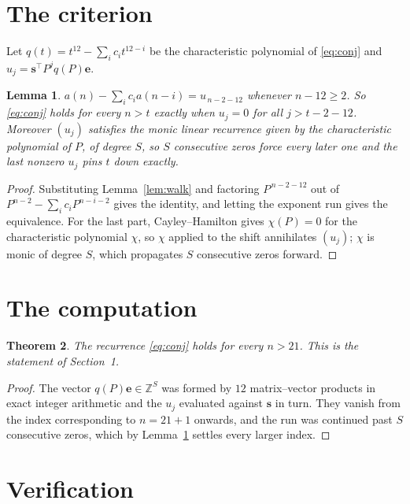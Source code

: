 \documentclass[11pt,a4paper]{article}
\theoremstyle{plain}
\newtheorem{theorem}{Theorem}
\newtheorem{lemma}[theorem]{Lemma}
\theoremstyle{definition}
\begin{document}
\section{The criterion}

Let $q(t)=t^{12}-\sum_i c_i t^{12-i}$ be the characteristic polynomial of
\eqref{eq:conj} and $u_j=\mathbf{s}^{\!\top}P^{j}q(P)\mathbf{e}$.

\begin{lemma}\label{lem:crit}
$a(n)-\sum_i c_i a(n-i)=u_{\,n-2-12}$ whenever $n-12\ge2$. So \eqref{eq:conj}
holds for every $n>t$ exactly when $u_j=0$ for all $j>t-2-12$. Moreover $(u_j)$
satisfies the monic linear recurrence given by the characteristic polynomial of $P$, of
degree $S$, so $S$ consecutive zeros force every later one and the last nonzero $u_j$ pins
$t$ down exactly.
\end{lemma}

\begin{proof}
Substituting Lemma~\ref{lem:walk} and factoring $P^{\,n-2-12}$ out of
$P^{n-2}-\sum_i c_i P^{n-i-2}$ gives the identity, and letting the exponent run gives the
equivalence. For the last part, Cayley--Hamilton gives $\chi(P)=0$ for the characteristic
polynomial $\chi$, so $\chi$ applied to the shift annihilates $(u_j)$; $\chi$ is monic of
degree $S$, which propagates $S$ consecutive zeros forward.
\end{proof}

\section{The computation}

\begin{theorem}
The recurrence \eqref{eq:conj} holds for every $n>21$. This is the statement of
Section~1.
\end{theorem}

\begin{proof}
The vector $q(P)\mathbf{e}\in\mathbb{Z}^{S}$ was formed by $12$ matrix--vector
products in exact integer arithmetic and the $u_j$ evaluated against $\mathbf{s}$ in turn.
They vanish from the index corresponding to $n=21+1$ onwards, and the run was continued
past $S$ consecutive zeros, which by Lemma~\ref{lem:crit} settles every larger index.
\end{proof}

\section{Verification}
\end{document}
